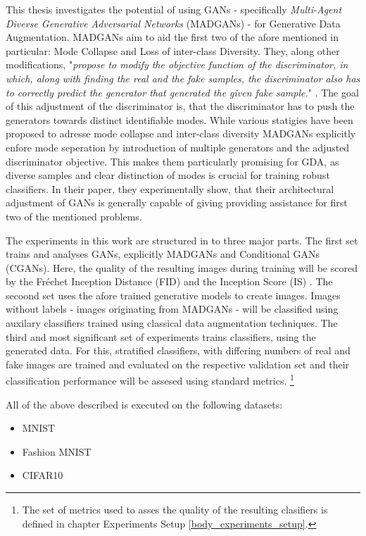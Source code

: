 This thesis investigates the potential of using GANs - specifically \textit{Multi-Agent Diverse Generative Adversarial Networks} (MADGANs) \cite{ghosh2018multiagentdiversegenerativeadversarial} - for Generative Data Augmentation. MADGANs aim to aid the first two of the afore mentioned in particular: Mode Collapse and Loss of inter-class Diversity. They, along other modifications, "\textit{propose to modify the objective function of the discriminator, in which, along with finding the real and the fake samples, the discriminator also has to correctly predict the generator that generated the given fake sample.}" \cite{ghosh2018multiagentdiversegenerativeadversarial}. The goal of this adjustment of the discriminator is, that the discriminator has to push the generators towards distinct identifiable modes. While various statigies have been proposed to adresse mode collapse and inter-class diversity MADGANs explicitly enfore mode seperation by introduction of multiple generators and the adjusted discriminator objective. This makes them particularly promising for GDA, as diverse samples and clear distinction of modes is crucial for training robust classifiers. In their paper, they experimentally show, that their architectural adjustment of GANs is generally capable of giving providing assistance for first two of the mentioned problems.

The experiments in this work are structured in to three major parts.
The first set trains and analyses GANs, explicitly MADGANs and Conditional GANs (CGANs). Here, the quality of the resulting images during training will be scored by the Fréchet Inception Distance (FID) \cite{heusel2018ganstrainedtimescaleupdate} and the Inception Score (IS) \cite{salimans2016improvedtechniquestraininggans}.
The secoond set uses the afore trained generative models to create images. Images without labels - images originating from MADGANs - will be classified using auxilary classifiers trained using classical data augmentation techniques.
The third and most significant set of experiments trains classifiers, using the generated data. For this, stratified classifiers, with differing numbers of real and fake images are trained and evaluated on the respective validation set and their classification performance will be assesed using standard metrics.
\footnote{The set of metrics used to asses the quality of the resulting clasifiers is defined in chapter Experiments Setup \ref{body_experiments_setup}.}


All of the above described is executed on the following datasets:
\begin{itemize}\label{used_datasets}
    \setlength{\itemsep}{-5pt}
    \item MNIST \cite{lecun2010mnist}
    \item Fashion MNIST \cite{xiao2017fashionmnist}
    \item CIFAR10 \cite{Krizhevsky2009learning}
\end{itemize}


